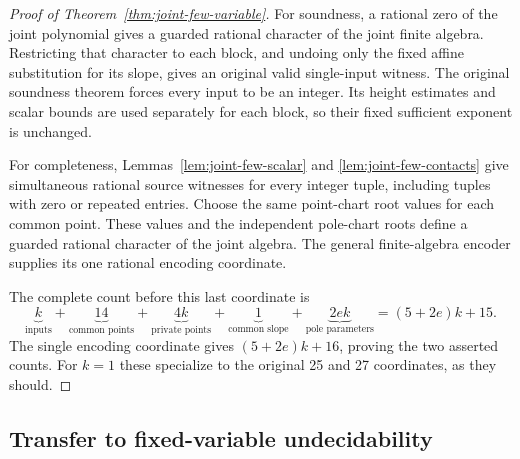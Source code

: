 \documentclass[11pt]{article}
\begin{document}
\begin{proof}[Proof of Theorem~\ref{thm:joint-few-variable}]
For soundness, a rational zero of the joint polynomial gives a
guarded rational character of the joint finite algebra.  Restricting
that character to each block, and undoing only the fixed affine
substitution for its slope, gives an original valid single-input
witness.  The original soundness theorem forces every input to
be an integer.  Its height estimates and scalar bounds are used
separately for each block, so their fixed sufficient exponent is
unchanged.

For completeness, Lemmas~\ref{lem:joint-few-scalar} and
\ref{lem:joint-few-contacts} give simultaneous rational source
witnesses for every integer tuple, including tuples with zero
or repeated entries.  Choose the same point-chart root values for
each common point.  These values and the independent pole-chart
roots define a guarded rational character of the joint algebra.
The general finite-algebra encoder supplies its one rational
encoding coordinate.

The complete count before this last coordinate is
\[
 \underbrace{k}_{\text{inputs}}+
 \underbrace{14}_{\text{common points}}+
 \underbrace{4k}_{\text{private points}}+
 \underbrace{1}_{\text{common slope}}+
 \underbrace{2ek}_{\text{pole parameters}}
                 =(5+2e)k+15.
\]
The single encoding coordinate gives $(5+2e)k+16$, proving the
two asserted counts.  For $k=1$ these specialize to the original
25 and 27 coordinates, as they should.
\end{proof}

\subsection{Transfer to fixed-variable undecidability}
\end{document}
